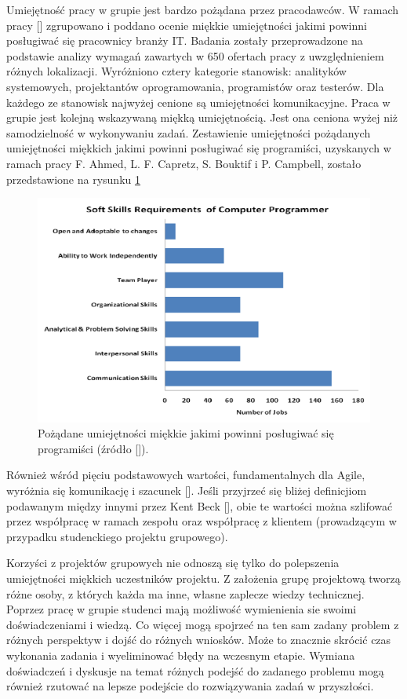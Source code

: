 Umiejętność pracy w grupie jest bardzo pożądana przez pracodawców.
W ramach pracy [] zgrupowano i poddano ocenie miękkie umiejętności jakimi powinni posługiwać się pracownicy branży IT.
Badania zostały przeprowadzone na podstawie analizy wymagań zawartych w 650 ofertach pracy z uwzględnieniem różnych lokalizacji.
Wyróżniono cztery kategorie stanowisk: analityków systemowych, projektantów oprogramowania, programistów oraz testerów.
Dla każdego ze stanowisk najwyżej cenione są umiejętności komunikacyjne.
Praca w grupie jest kolejną wskazywaną miękką umiejętnością.
Jest ona ceniona wyżej niż samodzielność w wykonywaniu zadań.
Zestawienie umiejętności pożądanych umiejętności miękkich jakimi powinni posługiwać się programiści, uzyskanych w ramach pracy F. Ahmed, L. F. Capretz, S. Bouktif i P. Campbell, zostało przedstawione na rysunku \ref{fig:soft-skills}

\begin{figure}[h]
    \centering
    \includegraphics[width = 13cm]{chapter01/soft-skills.png}
    \caption{Pożądane umiejętności miękkie jakimi powinni posługiwać się programiści (źródło []).}
    \label{fig:soft-skills}
\end{figure}

Również wśród pięciu podstawowych wartości, fundamentalnych dla Agile, wyróżnia się komunikację i szacunek [].
Jeśli przyjrzeć się bliżej definicjiom podawanym między innymi przez Kent Beck [], obie te wartości można szlifować przez współpracę w ramach zespołu oraz współpracę z klientem (prowadzącym w przypadku studenckiego projektu grupowego).

Korzyści z projektów grupowych nie odnoszą się tylko do polepszenia umiejętności miękkich uczestników projektu.
Z założenia grupę projektową tworzą różne osoby, z których każda ma inne, własne zaplecze wiedzy technicznej.
Poprzez pracę w grupie studenci mają możliwość wymienienia sie swoimi doświadczeniami i wiedzą.
Co więcej mogą spojrzeć na ten sam zadany problem z różnych perspektyw i dojść do różnych wniosków.
Może to znacznie skrócić czas wykonania zadania i wyeliminować błędy na wczesnym etapie. 
Wymiana doświadczeń i dyskusje na temat różnych podejść do zadanego problemu mogą również rzutować na lepsze podejście do rozwiązywania zadań w przyszłości.

